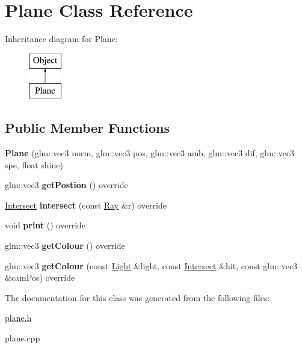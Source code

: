 \hypertarget{class_plane}{}\section{Plane Class Reference}
\label{class_plane}
Inheritance diagram for Plane\+:\begin{figure}[H]
\begin{center}
\leavevmode
\includegraphics[height=2.000000cm]{class_plane}
\end{center}
\end{figure}
\subsection*{Public Member Functions}
\begin{DoxyCompactItemize}
\item 
\mbox{\label{class_plane_a7aef2d9e06892562f982d9fd6596370c}} 
{\bfseries Plane} (glm\+::vec3 norm, glm\+::vec3 pos, glm\+::vec3 amb, glm\+::vec3 dif, glm\+::vec3 spe, float shine)
\item 
\mbox{\label{class_plane_a61c43d837a1921039d9b3466d1284741}} 
glm\+::vec3 {\bfseries get\+Postion} () override
\item 
\mbox{\label{class_plane_a76cf36bbdaaed72e59aa7ecd9dcb9dba}} 
\mbox{\hyperlink{struct_intersect}{Intersect}} {\bfseries intersect} (const \mbox{\hyperlink{struct_ray}{Ray}} \&r) override
\item 
\mbox{\label{class_plane_a3d9139793b931279e3dcd1fd80a263c7}} 
void {\bfseries print} () override
\item 
\mbox{\label{class_plane_a81494e203b2cd4bf67d00c2503e1929f}} 
glm\+::vec3 {\bfseries get\+Colour} () override
\item 
\mbox{\label{class_plane_a6f2ddd0896e72b7446e2f9acad20c7c3}} 
glm\+::vec3 {\bfseries get\+Colour} (const \mbox{\hyperlink{class_light}{Light}} \&light, const \mbox{\hyperlink{struct_intersect}{Intersect}} \&hit, const glm\+::vec3 \&cam\+Pos) override
\end{DoxyCompactItemize}


The documentation for this class was generated from the following files\+:\begin{DoxyCompactItemize}
\item 
\mbox{\hyperlink{plane_8h}{plane.\+h}}\item 
plane.\+cpp\end{DoxyCompactItemize}
